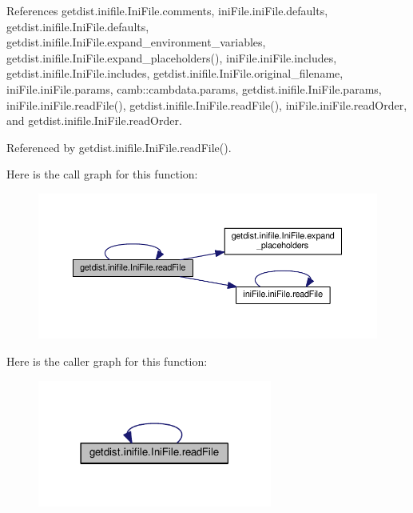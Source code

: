 References getdist.\+inifile.\+Ini\+File.\+comments, ini\+File.\+ini\+File.\+defaults, getdist.\+inifile.\+Ini\+File.\+defaults, getdist.\+inifile.\+Ini\+File.\+expand\+\_\+environment\+\_\+variables, getdist.\+inifile.\+Ini\+File.\+expand\+\_\+placeholders(), ini\+File.\+ini\+File.\+includes, getdist.\+inifile.\+Ini\+File.\+includes, getdist.\+inifile.\+Ini\+File.\+original\+\_\+filename, ini\+File.\+ini\+File.\+params, camb\+::cambdata.\+params, getdist.\+inifile.\+Ini\+File.\+params, ini\+File.\+ini\+File.\+read\+File(), getdist.\+inifile.\+Ini\+File.\+read\+File(), ini\+File.\+ini\+File.\+read\+Order, and getdist.\+inifile.\+Ini\+File.\+read\+Order.



Referenced by getdist.\+inifile.\+Ini\+File.\+read\+File().

Here is the call graph for this function\+:
\nopagebreak
\begin{figure}[H]
\begin{center}
\leavevmode
\includegraphics[width=350pt]{classgetdist_1_1inifile_1_1IniFile_a732b3b9d1e3a91cf678a8f47019ed010_cgraph}
\end{center}
\end{figure}
Here is the caller graph for this function\+:
\nopagebreak
\begin{figure}[H]
\begin{center}
\leavevmode
\includegraphics[width=218pt]{classgetdist_1_1inifile_1_1IniFile_a732b3b9d1e3a91cf678a8f47019ed010_icgraph}
\end{center}
\end{figure}
\mbox{\label{classgetdist_1_1inifile_1_1IniFile_aa45dd09190b83f711db6d9ab55605f50}} 
